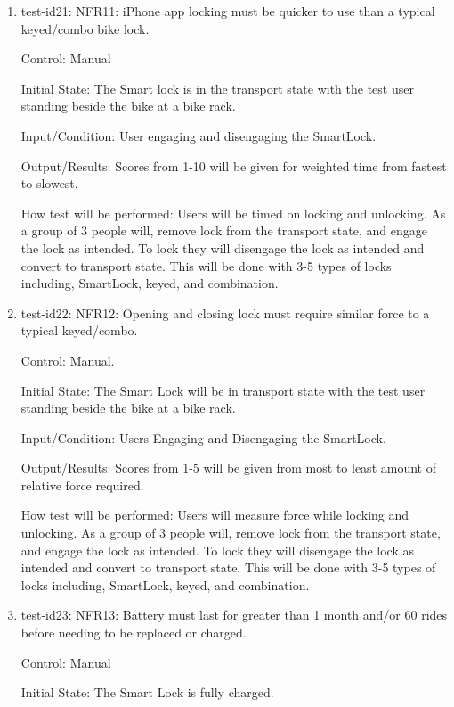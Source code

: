 \documentclass[12pt, titlepage]{article}
\begin{document}
\begin{enumerate}

\item{test-id21: NFR11: iPhone app locking must be quicker to use than a typical keyed/combo bike lock.  \\}

Control: Manual 

Initial State: The Smart lock is in the transport state with the test user standing beside the bike at a bike rack.

Input/Condition: User engaging and disengaging the SmartLock.

Output/Results: Scores from 1-10 will be given for weighted time from fastest to slowest.

How test will be performed: Users will be timed on locking and unlocking. As a group of 3 people will, remove lock from the transport state, and engage the lock as intended. To lock they will disengage the lock as intended and convert to transport state. This will be done with 3-5 types of locks including, SmartLock, keyed, and combination.

\item{test-id22: NFR12: Opening and closing lock must require similar force to a typical keyed/combo.  \\}

Control: Manual.

Initial State: The Smart Lock will be in transport state with the test user standing beside the bike at a bike rack.

Input/Condition: Users Engaging and Disengaging the SmartLock.

Output/Results: Scores from 1-5 will be given from most to least amount of relative force required.

How test will be performed: Users will measure force while locking and unlocking. As a group of 3 people will, remove lock from the transport state, and engage the lock as intended. To lock they will disengage the lock as intended and convert to transport state. This will be done with 3-5 types of locks including, SmartLock, keyed, and combination.

\item{test-id23: NFR13: Battery must last for greater than 1 month and/or 60 rides before needing to be replaced or charged.  \\}

Control: Manual 

Initial State: The Smart Lock is fully charged.


\end{enumerate}
\end{document}
